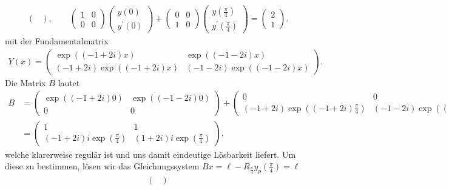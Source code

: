 \begin{solution}
\begin{enumerate}[label = \textbf{\alph*)}]
\begin{align*}
\begin{pmatrix}
    \end{pmatrix}, \qquad
    \begin{pmatrix}
      1 & 0 \\ 0 & 0
    \end{pmatrix}
    \begin{pmatrix}
      y(0) \\ y^{\prime}(0)
    \end{pmatrix}
    +
    \begin{pmatrix}
      0 & 0 \\ 1 & 0
    \end{pmatrix}
    \begin{pmatrix}
      y(\frac{\pi}{4}) \\ y^{\prime}(\frac{\pi}{4})
    \end{pmatrix}
    =
    \begin{pmatrix}
      2 \\ 1
    \end{pmatrix}.
  \end{align*}
  mit der Fundamentalmatrix
  \begin{align*}
    Y(x) = \begin{pmatrix}
      \exp((-1+2i)x) & \exp((-1-2i)x) \\
      (-1+2i)\exp((-1+2i)x) & (-1-2i)\exp((-1-2i)x)
    \end{pmatrix}.
  \end{align*}
  Die Matrix $B$ lautet
  \begin{align*}
    B &= \begin{pmatrix}
      \exp((-1 + 2i)0) & \exp((-1 - 2i)0) \\ 0 & 0
    \end{pmatrix}
    +
    \begin{pmatrix}
       0 & 0\\ (-1 + 2i)\exp((-1 + 2i)\frac{\pi}{4}) & (-1 -2i)\exp((-1 - 2i)\frac{\pi}{4})
    \end{pmatrix} \\
    &= \begin{pmatrix}
      1 & 1\\
      (-1 + 2i)i\exp(\frac{\pi}{4}) & (1 + 2i)i\exp(\frac{\pi}{4})
    \end{pmatrix},
  \end{align*}
  welche klarerweise regulär ist und uns damit eindeutige Lösbarkeit liefert.
  Um diese zu bestimmen, lösen wir das Gleichungssystem $Bx = \ell - R_{\frac{\pi}{4}}y_p(\frac{\pi}{4}) = \ell$
  \begin{align*}
    \begin{pmatrix}

\end{pmatrix}
\end{align*}
\end{enumerate}
\end{solution}
